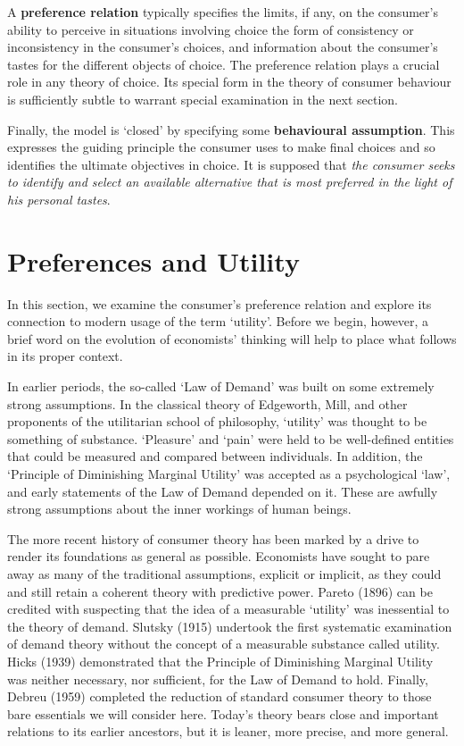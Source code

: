 \documentclass[b5paper]{memoir}
\let\markupwd\textbf
\begin{document}
A \markupwd{preference relation} typically specifies the limits, if any, on the consumer’s
ability to perceive in situations involving choice the form of consistency or
inconsistency in the consumer’s choices, and information about the consumer’s tastes for
the different objects of choice. The preference relation plays a crucial role in any
theory of choice. Its special form in the theory of consumer behaviour is sufficiently
subtle to warrant special examination in the next section.

Finally, the model is ‘closed’ by specifying some \markupwd{behavioural assumption}. This
expresses the guiding principle the consumer uses to make final choices and so identifies
the ultimate objectives in choice. It is supposed that \emph{the consumer seeks to
identify and select an available alternative that is most preferred in the light of his
personal tastes}.


\section{Preferences and Utility}

In this section, we examine the consumer’s preference relation and explore its connection
to modern usage of the term ‘utility’. Before we begin, however, a brief word on the
evolution of economists’ thinking will help to place what follows in its proper context.

In earlier periods, the so-called ‘Law of Demand’ was built on some extremely strong
assumptions. In the classical theory of Edgeworth, Mill, and other proponents of the
utilitarian school of philosophy, ‘utility’ was thought to be something of substance.
‘Pleasure’ and ‘pain’ were held to be well-defined entities that could be measured and
compared between individuals. In addition, the ‘Principle of Diminishing Marginal Utility’
was accepted as a psychological ‘law’, and early statements of the Law of Demand depended
on it. These are awfully strong assumptions about the inner workings of human beings.

The more recent history of consumer theory has been marked by a drive to render its
foundations as general as possible. Economists have sought to pare away as many of the
traditional assumptions, explicit or implicit, as they could and still retain a coherent
theory with predictive power. Pareto (1896) can be credited with suspecting that the idea
of a measurable ‘utility’ was inessential to the theory of demand. Slutsky (1915)
undertook the first systematic examination of demand theory without the concept of a
measurable substance called utility. Hicks (1939) demonstrated that the Principle of
Diminishing Marginal Utility was neither necessary, nor sufficient, for the Law of Demand
to hold. Finally, Debreu (1959) completed the reduction of standard consumer theory to
those bare essentials we will consider here. Today’s theory bears close and important
relations to its earlier ancestors, but it is leaner, more precise, and more general.
\end{document}
